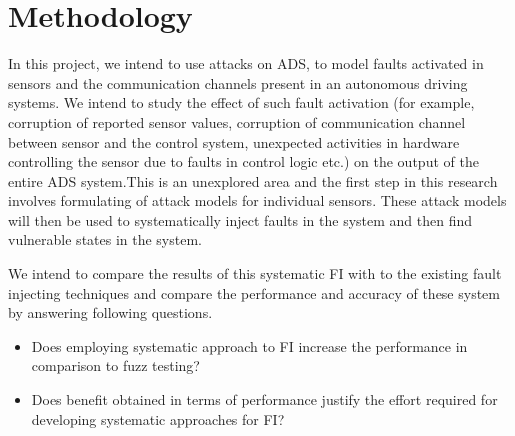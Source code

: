\section{Methodology}

In this project, we intend to use attacks on ADS, to model faults activated in sensors and the communication channels present in an autonomous driving systems. We intend to study the effect of such fault activation (for example, corruption of reported sensor values, corruption of communication channel between sensor and the control system, unexpected activities in hardware controlling the sensor due to faults in control logic etc.) on the output of the entire ADS system.This is an unexplored area and the first step in this research involves formulating of attack models for individual sensors. These attack models will then be used to systematically inject faults in the system and then find vulnerable states in the system.

We intend to compare the results of this systematic FI with to the existing fault injecting techniques and compare the performance and accuracy of these system by answering following questions. 

\begin{itemize}
\item  Does employing systematic approach to FI increase the performance in comparison to fuzz testing?

\item Does benefit obtained in terms of performance justify the effort required for developing systematic approaches for FI?

\end{itemize}


